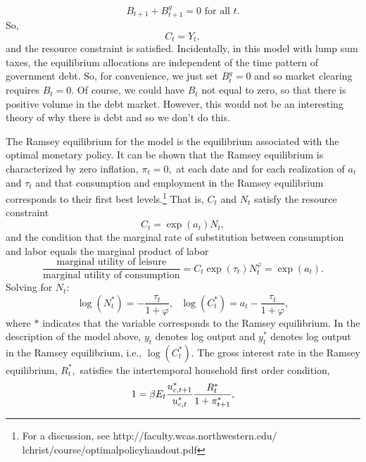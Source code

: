 \documentclass[12pt,thmsa]{article}
\begin{document}
\begin{equation*}
B_{t+1}+B_{t+1}^{g}=0\text{ for all }t.
\end{equation*}%
So,%
\begin{equation*}
C_{t}=Y_{t},
\end{equation*}%
and the resource constraint is satisfied. Incidentally, in this model with
lump sum taxes, the equilibrium allocations are independent of the time
pattern of government debt. So, for convenience, we just set $B_{t}^{g}=0$
and so market clearing requires $B_{t}=0.$ Of course, we could have $B_{t}$
not equal to zero, so that there is positive volume in the debt market.
However, this would not be an interesting theory of why there is debt and so
we don't do this.

The Ramsey equilibrium for the model is the equilibrium associated with the
optimal monetary policy. It can be shown that the Ramsey equilibrium is
characterized by zero inflation, $\pi _{t}=0,$ at each date and for each
realization of $a_{t}$ and $\tau _{t}$ and that consumption and employment
in the Ramsey equilibrium corresponds to their first best levels.\footnote{%
For a discussion, see http://faculty.wcas.northwestern.edu/%
lchrist/course/optimalpolicyhandout.pdf} That is, $C_{t}$ and $N_{t}$
satisfy the resource constraint%
\begin{equation*}
C_{t}=\exp \left( a_{t}\right) N_{t},
\end{equation*}%
and the condition that the marginal rate of substitution between consumption
and labor equals the marginal product of labor%
\begin{equation*}
\frac{\text{marginal utility of leisure}}{\text{marginal utility of
consumption}}=C_{t}\exp \left( \tau _{t}\right) N_{t}^{\varphi }=\exp \left(
a_{t}\right) .
\end{equation*}%
Solving for $N_{t}:$%
\begin{equation*}
\log \left( N_{t}^{\ast }\right) =-\frac{\tau _{t}}{1+\varphi },\text{ }\log
\left( C_{t}^{\ast }\right) =a_{t}-\frac{\tau _{t}}{1+\varphi },
\end{equation*}%
where $\ast $ indicates that the variable corresponds to the Ramsey
equilibrium. In the description of the model above, $y_{t}$ denotes log
output and $y_{t}^{\ast }$ denotes log output in the Ramsey equilibrium,
i.e., $\log \left( C_{t}^{\ast }\right) .$ The gross interest rate in the
Ramsey equilibrium, $R_{t}^{\ast },$ satisfies the intertemporal household
first order condition, 
\begin{equation*}
1=\beta E_{t}\frac{u_{c,t+1}^{\ast }}{u_{c,t}^{\ast }}\frac{R_{t}^{\ast }}{%
1+\pi _{t+1}^{\ast }},
\end{equation*}%
\end{document}
